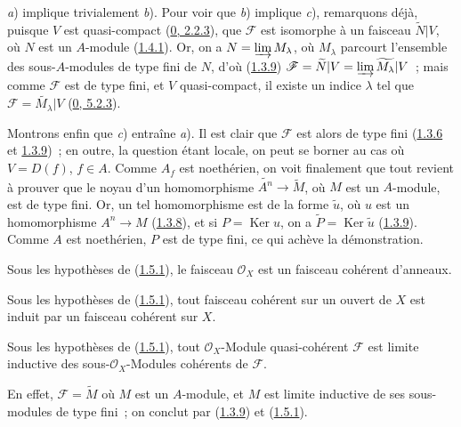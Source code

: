 \textit{a}) implique trivialement \textit{b}). Pour voir que \textit{b})
implique \textit{c}), remarquons déjà, puisque $V$ est quasi-compact
(\hyperref[0.2.2.3-fr]{0, 2.2.3}), que $\mathscr{F}$ est isomorphe à un
faisceau $\widetilde{N}|V$, où $N$ est un $A$-module
(\hyperref[I.1.4.1-fr]{1.4.1}). Or, on a
$N=\varinjlim M_\lambda$, où $M_\lambda$ parcourt l'ensemble des
sous-$A$-modules de type fini de $N$, d'où
(\hyperref[I.1.3.9-fr]{1.3.9})
$\mathscr{F}=\widetilde{N}|V=\varinjlim\widetilde{M_\lambda}|V$~; mais comme
$\mathscr{F}$ est de type fini, et $V$ quasi-compact, il existe un indice
$\lambda$ tel que $\mathscr{F}=\widetilde{M_\lambda}|V$
(\hyperref[0.5.2.3-fr]{0, 5.2.3}).

Montrons enfin que \textit{c}) entraîne \textit{a}). Il est clair que
$\mathscr{F}$ est alors de type fini
(\hyperref[I.1.3.6-fr]{1.3.6} et \hyperref[I.1.3.9-fr]{1.3.9})~; en outre,
la question étant locale, on peut se borner au cas où $V=D(f)$, $f\in A$.
Comme $A_f$ est noethérien, on voit finalement que tout revient à prouver
que le noyau d'un homomorphisme $\widetilde{A^n}\to\widetilde{M}$, où $M$
est un $A$-module, est de type fini. Or, un tel homomorphisme est de la
forme $\widetilde{u}$, où $u$ est un homomorphisme $A^n\to M$
(\hyperref[I.1.3.8-fr]{1.3.8}), et si $P=\operatorname{Ker}u$, on a
$\widetilde{P}=\operatorname{Ker}\widetilde{u}$
(\hyperref[I.1.3.9-fr]{1.3.9}). Comme $A$ est noethérien, $P$ est de type
fini, ce qui achève la démonstration.

\begin{corollary}[1.5.2]
\label{I.1.5.2-fr}
Sous les hypothèses de (\hyperref[I.1.5.1-fr]{1.5.1}), le faisceau
$\mathscr{O}_X$ est un faisceau cohérent d'anneaux.
\end{corollary}

\begin{corollary}[1.5.3]
\label{I.1.5.3-fr}
Sous les hypothèses de (\hyperref[I.1.5.1-fr]{1.5.1}), tout faisceau
cohérent sur un ouvert de $X$ est induit par un faisceau cohérent sur $X$.
\end{corollary}

\begin{corollary}[1.5.4]
\label{I.1.5.4-fr}
Sous les hypothèses de (\hyperref[I.1.5.1-fr]{1.5.1}), tout
$\mathscr{O}_X$-Module quasi-cohérent $\mathscr{F}$ est limite inductive
des sous-$\mathscr{O}_X$-Modules cohérents de $\mathscr{F}$.
\end{corollary}

En effet, $\mathscr{F}=\widetilde{M}$ où $M$ est un $A$-module, et $M$ est
limite inductive de ses sous-modules de type fini~; on conclut par
(\hyperref[I.1.3.9-fr]{1.3.9}) et
(\hyperref[I.1.5.1-fr]{1.5.1}).

